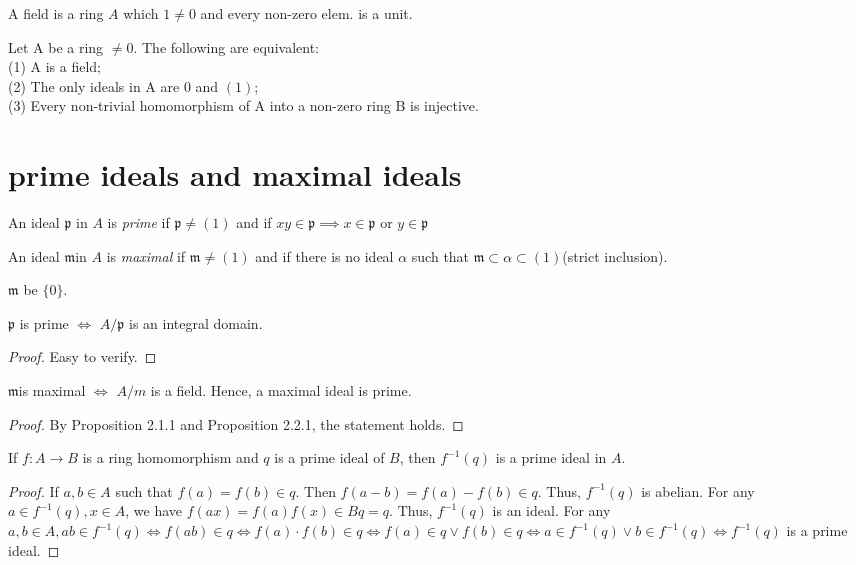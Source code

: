 \documentclass[11pt,fleqn]{book} %
\begin{document}
\begin{CJK}{UTF8}{gkai}
\begin{definition}
	[field] A field is a ring $A$ which $1 \neq 0$ and every non-zero elem. is a unit.
\end{definition}

\begin{proposition}
Let A be a ring $\neq 0$. The following are equivalent:\\
(1) A is a field;\\
(2) The only ideals in A are ${0}$ and $(1)$; \\
(3) Every non-trivial homomorphism of A into a non-zero ring B is injective.	
\end{proposition}

\section{prime ideals and maximal ideals}
\newcommand{\fp}{\mathfrak{p}}
\newcommand{\fm}{$\mathfrak{m}$}
\begin{definition}
	An ideal $\fp$ in $A$ is {\it prime} if $\fp \neq (1)$ and if $xy \in \fp \implies x\in \fp$ or $y \in \mathfrak{p}$ 
\end{definition}

\begin{definition}
	 An ideal \fm in $A$ is {\it maximal} if \fm $\neq (1)$ and if there is no ideal $\alpha $ such that \fm $\subset \alpha \subset (1)$(strict inclusion).
\end{definition}
\begin{remark}
	\fm {} be $\{0\}$.
\end{remark}

\begin{proposition}
	$\fp$ is prime $\iff$ $A/\fp$ is an integral domain.
\end{proposition}
\begin{proof}
	Easy to verify.
\end{proof}

\begin{proposition}
	\fm \text{ }is maximal $\iff$ $A/m$ is a field. Hence, a maximal ideal is prime.
\end{proposition}
\begin{proof}
	By Proposition 2.1.1 and Proposition 2.2.1, the statement holds.
\end{proof}

\begin{proposition}
	If $f: A\to B$ is a ring homomorphism and $q$ is a prime ideal of $B$, then $f^{-1}(q)$ is a prime ideal in $A$.
\end{proposition}
\begin{proof}
	If $a, b \in A$ such that $f(a) = f(b) \in q$. Then $f(a-b) = f(a)-f(b) \in q$. Thus, $f^{-1}(q)$ is abelian. For any $a \in f^{-1}(q), x \in A$, we have 
	$f(ax) = f(a)f(x) \in Bq = q$. Thus, $f^{-1}(q)$ is an ideal. For any $a, b\in A, ab \in f^{-1}(q) \iff f(ab) \in q \iff f(a)\cdot f(b)\in q \iff f(a) \in q \vee f(b) \in q \iff a \in f^{-1}(q) \vee b \in f^{-1}(q) \iff f^{-1}(q)$ is a prime ideal.  	
\end{proof}


\end{CJK}
\end{document}
